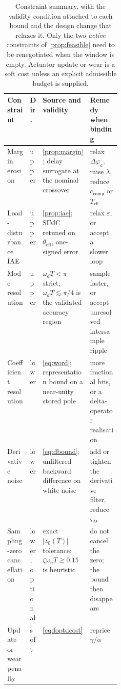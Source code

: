 \documentclass[a4paper,fleqn]{cas-sc}
\theoremstyle{remark}
\newcommand{\thetaeff}{\theta_{\mathrm{eff}}}
\newcommand{\wn}{\omega_n}
\begin{document}
\begin{table}[pos=!htb]
\caption{Constraint summary, with the validity condition attached to each
bound and the design change that relaxes it. Only the two \emph{active}
constraints of \cref{prop:feasible} need to be renegotiated when the window
is empty. Actuator update or wear is a soft cost unless an explicit
admissible budget is supplied.}
\label{tab:constraints}
\small
\setlength{\tabcolsep}{3.5pt}
\begin{tabularx}{\linewidth}{@{}>{\raggedright\arraybackslash}p{0.20\linewidth}>{\centering\arraybackslash}p{0.07\linewidth}>{\raggedright\arraybackslash}X>{\raggedright\arraybackslash}X@{}}
\toprule
Constraint & Dir. & Source and validity & Remedy when binding\\
\midrule
Margin erosion & upper & \cref{prop:margin}; delay surrogate at the nominal crossover & relax $\Delta\varphi_a$, raise $\lambda$, reduce $c_{\mathrm{comp}}$ or $T_{c0}$\\
Load-disturbance IAE & upper & \cref{prop:iae}; SIMC retuned on $\thetaeff$, one-signed error & relax $\varepsilon$, or accept a slower loop\\
Mode resolution & upper & $\omega_dT<\pi$ strict; $\omega_dT\lesssim\pi/4$ is the validated accuracy region & sample faster, or accept unresolved intersample ripple\\
Coefficient resolution & lower & \cref{eq:word}; representation bound on a near-unity stored pole & more fractional bits, or a delta-operator realisation\\
Derivative noise & lower & \cref{eq:dbound}; unfiltered backward difference on white noise & add or tighten the derivative filter, reduce $\tau_D$\\
Sampling-zero cancellation & lower, optional & exact $|z_0(T)|$ tolerance; $\zeta\wn T\gtrsim0.15$ is heuristic & do not cancel the zero; the bound then disappears\\
Update or wear penalty & soft & \cref{eq:foptdcost} & reprice $\gamma/\alpha$\\
\bottomrule
\end{tabularx}
\end{table}
\end{document}
